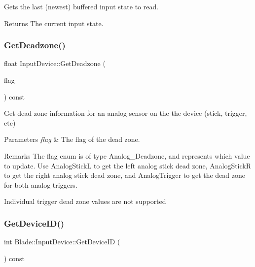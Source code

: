 Gets the last (newest) buffered input state to read. 

\begin{DoxyReturn}{Returns}
The current input state. 
\end{DoxyReturn}
\mbox{\label{class_blade_1_1_input_device_ab851fc6f3f7f40a376804be9d66a748d}} 
\subsubsection{\texorpdfstring{Get\+Deadzone()}{GetDeadzone()}}
{\footnotesize\ttfamily float Input\+Device\+::\+Get\+Deadzone (\begin{DoxyParamCaption}\item[{Analog\+Deadzone}]{flag }\end{DoxyParamCaption}) const}



Get dead zone information for an analog sensor on the the device (stick, trigger, etc) 


\begin{DoxyParams}{Parameters}
{\em flag} & The flag of the dead zone. \\
\hline
\end{DoxyParams}
\begin{DoxyRemark}{Remarks}
The flag enum is of type Analog\+\_\+\+Deadzone, and represents which value to update. Use Analog\+StickL to get the left analog stick dead zone, Analog\+StickR to get the right analog stick dead zone, and Analog\+Trigger to get the dead zone for both analog triggers. 

Individual trigger dead zone values are not supported 
\end{DoxyRemark}
\mbox{\label{class_blade_1_1_input_device_af05aace5ac1decaa1bf64bfefbcf013b}} 
\subsubsection{\texorpdfstring{Get\+Device\+I\+D()}{GetDeviceID()}}
{\footnotesize\ttfamily int Blade\+::\+Input\+Device\+::\+Get\+Device\+ID (\begin{DoxyParamCaption}{ }\end{DoxyParamCaption}) const\hspace{0.3cm}{\ttfamily [inline]}}



